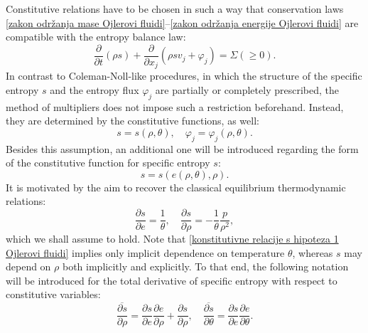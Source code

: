\documentclass[a4paper,fleqn]{cas-sc}
\theoremstyle{definition}
\begin{document}
Constitutive relations have to be chosen in such a way that conservation laws \eqref{zakon održanja mase Ojlerovi fluidi}--\eqref{zakon održanja energije Ojlerovi fluidi} are compatible with the entropy balance law: 
\begin{equation} \label{bilans entropije Ojlerovi fluidi}
	\dfrac{\partial}{\partial t}\left(\rho s\right)+\dfrac{\partial}{\partial x_j}\left(\rho sv_j+\varphi_j\right)=\Sigma (\geq 0). 
\end{equation}
In contrast to Coleman-Noll-like procedures, in which the structure of the specific entropy $s$ and the entropy flux $\varphi_{j}$ are partially or completely prescribed, the method of multipliers does not impose such a restriction beforehand. Instead, they are determined by the constitutive functions, as well: 
\begin{equation} \label{konstitutivne relacije s-phi Ojler}
	s = s(\rho, \theta), \quad \varphi_{j} = \varphi_{j}(\rho, \theta). 
\end{equation}
Besides this assumption, an additional one will be introduced regarding the form of the constitutive function for specific entropy $s$: 
\begin{equation} \label{konstitutivne relacije s hipoteza 1 Ojlerovi fluidi}
	s = s(e(\rho, \theta), \rho). 
\end{equation}
It is motivated by the aim to recover the classical equilibrium thermodynamic relations: 
\begin{equation} \label{konstitutivne relacije s hipoteza 2 Ojlerovi fluidi}
	\dfrac{\partial s}{\partial e} = \dfrac{1}{\theta}, \quad 
	\dfrac{\partial s}{\partial \rho} = - \dfrac{1}{\theta} \dfrac{p}{\rho^{2}}, 
\end{equation}
which we shall assume to hold. Note that \eqref{konstitutivne relacije s hipoteza 1 Ojlerovi fluidi} implies only implicit dependence on temperature $\theta$, whereas $s$ may depend on $\rho$ both implicitly and explicitly. To that end, the following notation will be introduced for the total derivative of specific entropy with respect to constitutive variables:
\begin{equation} \label{totalni izvod Ojlerovi fluidi}
	\overline{\dfrac{\partial s}{\partial \rho}} 
	= \dfrac{\partial s}{\partial e}\dfrac{\partial e}{\partial \rho} 
	+ \dfrac{\partial s}{\partial \rho}, 
	\quad
	\overline{\dfrac{\partial s}{\partial \theta}} 
	= \dfrac{\partial s}{\partial e}\dfrac{\partial e}{\partial \theta}. 
\end{equation} 
\end{document}
